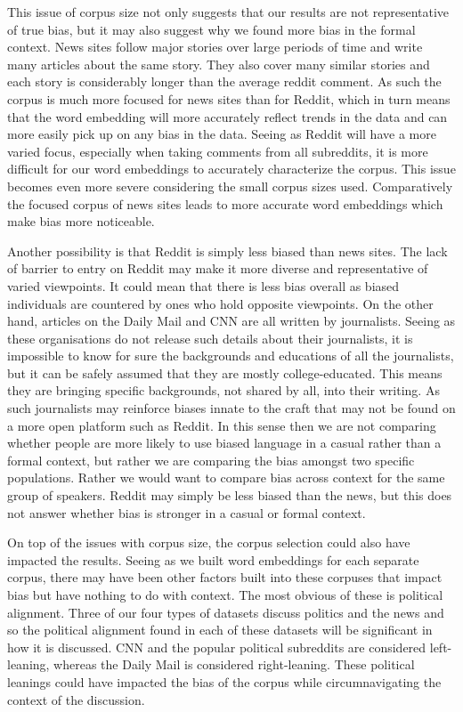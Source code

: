 \documentclass[10pt,letterpaper]{article}
\begin{document}
This issue of corpus size not only suggests that our results are not representative of true bias, but it may also suggest why we found more bias in the formal context. News sites follow major stories over large periods of time and write many articles about the same story. They also cover many similar stories and each story is considerably longer than the average reddit comment. As such the corpus is much more focused for news sites than for Reddit, which in turn means that the word embedding will more accurately reflect trends in the data and can more easily pick up on any bias in the data. Seeing as Reddit will have a more varied focus, especially when taking comments from all subreddits, it is more difficult for our word embeddings to accurately characterize the corpus. This issue becomes even more severe considering the small corpus sizes used. Comparatively the focused corpus of news sites leads to more accurate word embeddings which make bias more noticeable.

Another possibility is that Reddit is simply less biased than news sites. The lack of barrier to entry on Reddit may make it more diverse and representative of varied viewpoints. It could mean that there is less bias overall as biased individuals are countered by ones who hold opposite viewpoints. On the other hand, articles on the Daily Mail and CNN are all written by journalists. Seeing as these organisations do not release such details about their journalists, it is impossible to know for sure the backgrounds and educations of all the journalists, but it can be safely assumed that they are mostly college-educated. This means they are bringing specific backgrounds, not shared by all, into their writing. As such journalists may reinforce biases innate to the craft that may not be found on a more open platform such as Reddit. In this sense then we are not comparing whether people are more likely to use biased language in a casual rather than a formal context, but rather we are comparing the bias amongst two specific populations. Rather we would want to compare bias across context for the same group of speakers. Reddit may simply be less biased than the news, but this does not answer whether bias is stronger in a casual or formal context.

On top of the issues with corpus size, the corpus selection could also have impacted the results. Seeing as we built word embeddings for each separate corpus, there may have been other factors built into these corpuses that impact bias but have nothing to do with context. The most obvious of these is political alignment. Three of our four types of datasets discuss politics and the news and so the political alignment found in each of these datasets will be significant in how it is discussed. CNN and the popular political subreddits are considered left-leaning, whereas the Daily Mail is considered right-leaning. These political leanings could have impacted the bias of the corpus while circumnavigating the context of the discussion.
\end{document}
